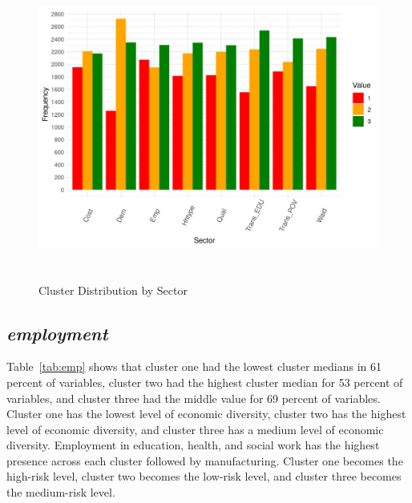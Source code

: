 \begin{figure}[htbp]
    \centering
     \includegraphics[width=1\textwidth, height=10cm]{plots/cluster_distribution.png}
     \caption{Cluster Distribution by Sector}
     \label{fig:cluster_dis}
 \end{figure}


 
\subsection{\textit{employment}}

Table~\ref{tab:emp} shows that cluster one had the lowest cluster medians in 61 percent of variables, cluster two had the highest cluster median for 53 percent of variables, and cluster three had the middle value for 69 %
percent of variables. Cluster one has the lowest level of economic diversity, cluster two has the highest level of economic diversity, and cluster three has a medium level of economic diversity. Employment in education, health, and social work has the highest presence across each cluster followed by manufacturing. Cluster one becomes the high-risk level, cluster two becomes the low-risk level, and cluster three becomes the medium-risk level.




